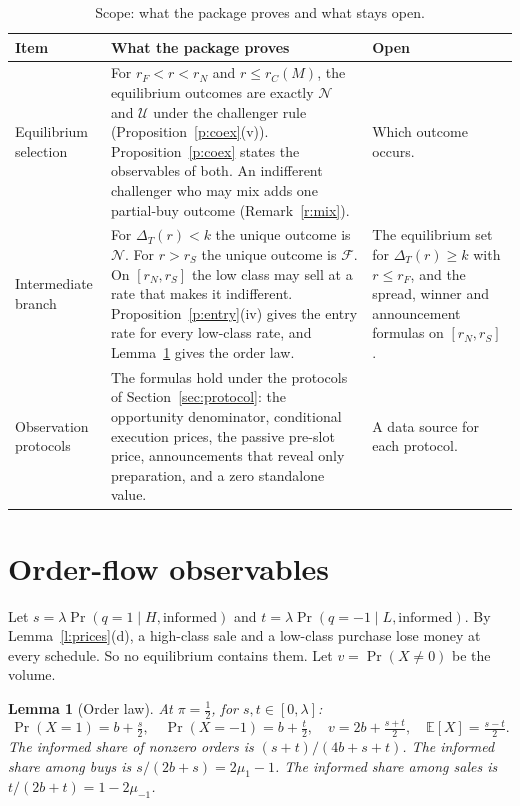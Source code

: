 \documentclass[12pt]{article}
\newtheorem{lemma}{Lemma}
\theoremstyle{definition}
\newcommand{\E}{\mathbb E}
\begin{document}
\begin{table}[H]
\centering\small
\caption{Scope: what the package proves and what stays open.}\label{tab:scope}
\begin{tabular}{@{}p{2.5cm}p{7.2cm}p{3.2cm}@{}}
\toprule
Item & What the package proves & Open\\
\midrule
Equilibrium selection & For $r_F<r<r_N$ and $r\le r_C(M)$, the equilibrium outcomes are exactly $\mathcal N$ and $\mathcal U$ under the challenger rule (Proposition~\ref{p:coex}(v)). Proposition~\ref{p:coex} states the observables of both. An indifferent challenger who may mix adds one partial-buy outcome (Remark~\ref{r:mix}). & Which outcome occurs.\\
Intermediate branch & For $\Delta_T(r)<k$ the unique outcome is $\mathcal N$. For $r>r_S$ the unique outcome is $\mathcal F$. On $[r_N,r_S]$ the low class may sell at a rate that makes it indifferent. Proposition~\ref{p:entry}(iv) gives the entry rate for every low-class rate, and Lemma~\ref{l:law} gives the order law. & The equilibrium set for $\Delta_T(r)\ge k$ with $r\le r_F$, and the spread, winner and announcement formulas on $[r_N,r_S]$.\\
Observation protocols & The formulas hold under the protocols of Section~\ref{sec:protocol}: the opportunity denominator, conditional execution prices, the passive pre-slot price, announcements that reveal only preparation, and a zero standalone value. & A data source for each protocol.\\
\bottomrule
\end{tabular}
\end{table}

\section{Order-flow observables}\label{sec:flow}

Let $s=\lambda\Pr(q=1\mid H,\text{informed})$ and $t=\lambda\Pr(q=-1\mid L,\text{informed})$.
By Lemma~\ref{l:prices}(d), a high-class sale and a low-class purchase lose money at every schedule.
So no equilibrium contains them.
Let $v=\Pr(X\ne0)$ be the volume.

\begin{lemma}[Order law]\label{l:law}
At $\pi=\tfrac12$, for $s,t\in[0,\lambda]$:
\[
\Pr(X=1)=b+\tfrac s2,\quad \Pr(X=-1)=b+\tfrac t2,\quad v=2b+\tfrac{s+t}2,\quad \E[X]=\tfrac{s-t}{2}.
\]
The informed share of nonzero orders is $(s+t)/(4b+s+t)$.
The informed share among buys is $s/(2b+s)=2\mu_1-1$.
The informed share among sales is $t/(2b+t)=1-2\mu_{-1}$.
\end{lemma}
\end{document}

